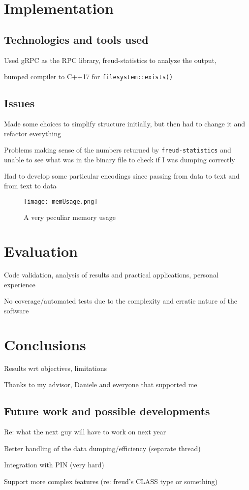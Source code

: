 \chapter{Implementation}
    
    \section{Technologies and tools used}

        Used gRPC \cite{gRPCdocs} as the RPC library, 
        freud-statistics \cite{freud} to analyze the output,
        
        bumped compiler to C++17 for \texttt{filesystem::exists()}

    \section{Issues}

        Made some choices to simplify structure initially, but then had to change it and
        refactor everything

        Problems making sense of the numbers returned by \texttt{freud-statistics} and unable
        to see what was in the binary file to check if I was dumping correctly

        Had to develop some particular encodings since passing from data to text and from text
        to data

        \begin{figure}[H]
            \centering
            \texttt{[image: memUsage.png]}
            \caption{A very peculiar memory usage}
            \label{fig:memUsage}
        \end{figure}


\chapter{Evaluation}

    Code validation, analysis of results and practical applications, personal experience

    No coverage/automated tests due to the complexity and erratic nature of the software


\chapter{Conclusions}

    Results wrt objectives, limitations

    Thanks to my advisor, Daniele and everyone that supported me

	\section{Future work and possible developments}

        Re: what the next guy will have to work on next year

        Better handling of the data dumping/efficiency (separate thread)

        Integration with PIN (very hard)

        Support more complex features (re: freud's CLASS type or something)
